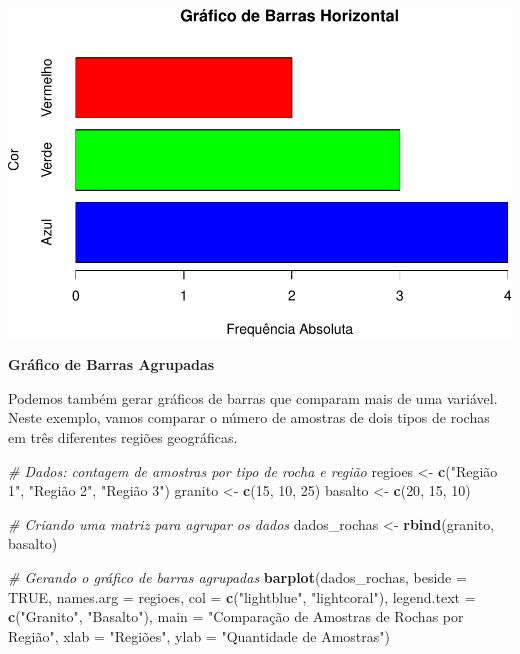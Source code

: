 \documentclass[
]{book}
\newenvironment{Shaded}{\begin{snugshade}}{\end{snugshade}}
\newcommand{\AttributeTok}[1]{\textcolor[rgb]{0.13,0.29,0.53}{#1}}
\newcommand{\CommentTok}[1]{\textcolor[rgb]{0.56,0.35,0.01}{\textit{#1}}}
\newcommand{\ConstantTok}[1]{\textcolor[rgb]{0.56,0.35,0.01}{#1}}
\newcommand{\DecValTok}[1]{\textcolor[rgb]{0.00,0.00,0.81}{#1}}
\newcommand{\FunctionTok}[1]{\textcolor[rgb]{0.13,0.29,0.53}{\textbf{#1}}}
\newcommand{\NormalTok}[1]{#1}
\newcommand{\OtherTok}[1]{\textcolor[rgb]{0.56,0.35,0.01}{#1}}
\newcommand{\StringTok}[1]{\textcolor[rgb]{0.31,0.60,0.02}{#1}}
\begin{document}
\includegraphics{introR_files/figure-latex/unnamed-chunk-163-1.pdf}

\textbf{Gráfico de Barras Agrupadas}

Podemos também gerar gráficos de barras que comparam mais de uma variável. Neste exemplo, vamos comparar o número de amostras de dois tipos de rochas em três diferentes regiões geográficas.

\begin{Shaded}
\begin{Highlighting}[]
\CommentTok{\# Dados: contagem de amostras por tipo de rocha e região}
\NormalTok{regioes }\OtherTok{\textless{}{-}} \FunctionTok{c}\NormalTok{(}\StringTok{"Região 1"}\NormalTok{, }\StringTok{"Região 2"}\NormalTok{, }\StringTok{"Região 3"}\NormalTok{)}
\NormalTok{granito }\OtherTok{\textless{}{-}} \FunctionTok{c}\NormalTok{(}\DecValTok{15}\NormalTok{, }\DecValTok{10}\NormalTok{, }\DecValTok{25}\NormalTok{)}
\NormalTok{basalto }\OtherTok{\textless{}{-}} \FunctionTok{c}\NormalTok{(}\DecValTok{20}\NormalTok{, }\DecValTok{15}\NormalTok{, }\DecValTok{10}\NormalTok{)}

\CommentTok{\# Criando uma matriz para agrupar os dados}
\NormalTok{dados\_rochas }\OtherTok{\textless{}{-}} \FunctionTok{rbind}\NormalTok{(granito, basalto)}

\CommentTok{\# Gerando o gráfico de barras agrupadas}
\FunctionTok{barplot}\NormalTok{(dados\_rochas, }
        \AttributeTok{beside =} \ConstantTok{TRUE}\NormalTok{, }
        \AttributeTok{names.arg =}\NormalTok{ regioes, }
        \AttributeTok{col =} \FunctionTok{c}\NormalTok{(}\StringTok{"lightblue"}\NormalTok{, }\StringTok{"lightcoral"}\NormalTok{), }
        \AttributeTok{legend.text =} \FunctionTok{c}\NormalTok{(}\StringTok{"Granito"}\NormalTok{, }\StringTok{"Basalto"}\NormalTok{),}
        \AttributeTok{main =} \StringTok{"Comparação de Amostras de Rochas por Região"}\NormalTok{, }
        \AttributeTok{xlab =} \StringTok{"Regiões"}\NormalTok{, }
        \AttributeTok{ylab =} \StringTok{"Quantidade de Amostras"}\NormalTok{)}
\end{Highlighting}
\end{Shaded}
\end{document}
